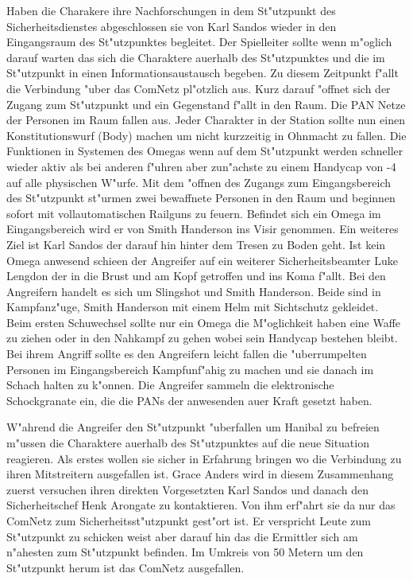 Haben die Charakere ihre Nachforschungen in dem St"utzpunkt des Sicherheitsdienstes abgeschlossen sie von Karl Sandos wieder in den Eingangsraum des St"utzpunktes begleitet. Der Spielleiter sollte wenn m"oglich darauf warten das sich die Charaktere au\3erhalb des St"utzpunktes und die im St"utzpunkt in einen Informationsaustausch begeben. Zu diesem Zeitpunkt f"allt die Verbindung "uber das ComNetz pl"otzlich aus. Kurz darauf "offnet sich der Zugang zum St"utzpunkt und ein Gegenstand f"allt in den Raum. Die PAN Netze der Personen im Raum fallen aus. Jeder Charakter in der Station sollte nun einen Konstitutionswurf (Body) machen um nicht kurzzeitig in Ohnmacht zu fallen. Die Funktionen in Systemen des Omegas wenn auf dem St"utzpunkt werden schneller wieder aktiv als bei anderen f"uhren aber zun"achste zu einem Handycap von -4 auf alle physischen W"urfe. Mit dem "offnen des Zugangs zum Eingangsbereich des St"utzpunkt st"urmen zwei bewaffnete Personen in den Raum und beginnen sofort mit vollautomatischen Railguns zu feuern. Befindet sich ein Omega im Eingangsbereich wird er von
Smith Handerson ins Visir genommen. Ein weiteres Ziel ist Karl Sandos der darauf hin hinter dem Tresen zu Boden geht. Ist kein Omega anwesend schie\3en der Angreifer auf ein weiterer Sicherheitsbeamter Luke Lengdon der in die Brust und am Kopf getroffen und ins Koma f"allt. Bei den Angreifern handelt es sich um Slingshot und Smith Handerson. Beide sind in Kampfanz"uge, Smith Handerson mit einem Helm mit Sichtschutz gekleidet. Beim ersten Schu\3wechsel sollte nur ein Omega die M"oglichkeit haben eine Waffe zu ziehen oder in den Nahkampf zu gehen wobei sein Handycap bestehen bleibt. Bei ihrem Angriff sollte es den Angreifern leicht fallen die "uberrumpelten Personen im Eingangsbereich Kampfunf"ahig zu machen und sie danach im Schach halten zu k"onnen. Die Angreifer sammeln die elektronische Schockgranate ein, die die PANs der anwesenden au\3er Kraft gesetzt haben.

W"ahrend die Angreifer den St"utzpunkt "uberfallen um Hanibal zu befreien m"ussen die Charaktere au\3erhalb des St"utzpunktes auf die neue Situation reagieren. Als erstes wollen sie sicher in Erfahrung bringen wo die Verbindung zu ihren Mitstreitern ausgefallen ist. Grace Anders wird in diesem Zusammenhang zuerst versuchen ihren direkten Vorgesetzten Karl Sandos und danach den Sicherheitschef Henk Arongate zu kontaktieren. Von ihm erf"ahrt sie da\3 nur das ComNetz zum Sicherheitsst"utzpunkt gest"ort ist. Er verspricht Leute zum St"utzpunkt zu schicken weist aber darauf hin das die Ermittler sich am n"ahesten zum St"utzpunkt befinden. Im Umkreis von 50 Metern um den St"utzpunkt herum ist das ComNetz ausgefallen. 

